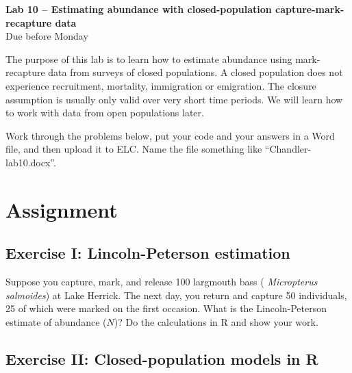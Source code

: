 \documentclass[12pt]{article}\usepackage[]{graphicx}\usepackage[]{color}
\begin{document}
{
  \Large
  \centering
  {\bf Lab 10 -- Estimating abundance with closed-population capture-mark-recapture data \\ }
  Due before Monday \\
}

\vspace{10pt}


The purpose of this lab is to learn how to estimate abundance using
mark-recapture data from surveys of closed populations. A closed
population does not experience recruitment, mortality, immigration or
emigration. The closure assumption is usually only valid over very
short time periods. We will learn how to work with data from open
populations later.

Work through the problems below, put your code and your answers in a
Word file, and then upload it to ELC. Name the file something like 
``Chandler-lab10.docx''.  


\section*{Assignment}

\subsection*{Exercise I: Lincoln-Peterson estimation}

Suppose you capture, mark, and release 100 largmouth bass ({\it
  Micropterus salmoides}) at Lake Herrick. The next day, you return
and capture 50 individuals, 25 of which were marked on the first
occasion. What is the Lincoln-Peterson estimate of abundance ($N$)?
Do the calculations in R and show your work.  


\subsection*{Exercise II: Closed-population models in R}
\end{document}
